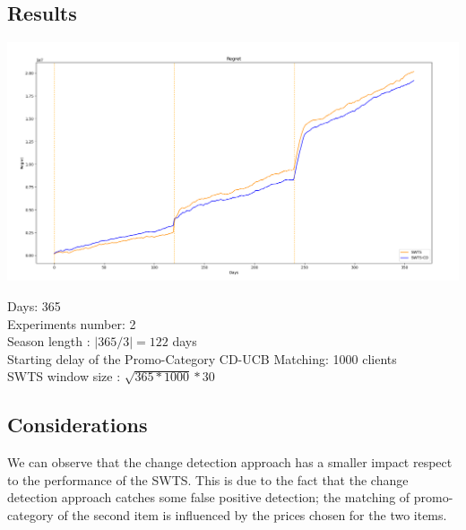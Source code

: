 \subsection*{Results}
\begin{center}
	\includegraphics[scale=0.35]{Images/n8}
\end{center}

Days: 365\\
Experiments number: 2 \\
Season length : $|365/3| = 122 $ days\\
Starting delay of the Promo-Category CD-UCB Matching: 1000 clients\\
SWTS window size : $\sqrt{365 * 1000} * 30$\\

\subsection*{Considerations}
We can observe that the change detection approach has a smaller impact respect to the performance of the SWTS. This is due to the fact that the change detection approach catches some false positive detection; the matching of promo-category of the second item is influenced by the prices chosen for the two items.
